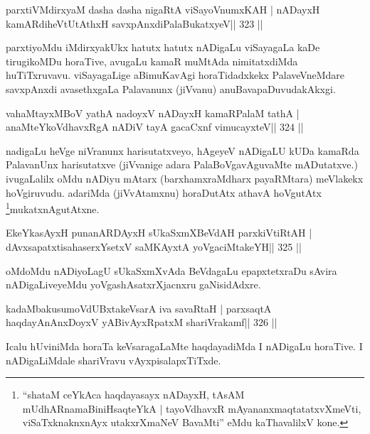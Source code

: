 
\begin{shl}
parxtiVMdirxyaM dasha dasha nigaRtA viSayoVnumxKAH |
nADayxH kamARdiheVtUtAthxH savxpAnxdiPalaBukatxyeV\hfill || 323 ||
\end{shl}

\begin{artha}
parxtiyoMdu iMdirxyakUkx hatutx hatutx nADigaLu viSayagaLa kaDe  tirugikoMDu horaTive, avugaLu kamaR muMtAda nimitatxdiMda huTiTxruvavu. viSayagaLige aBimuKavAgi horaTidadxkekx PalaveVneMdare  \mdash  savxpAnxdi avasethxgaLa Palavanunx (jiVvanu) anuBavapaDuvudakAkxgi.
\end{artha}

\begin{shl}
vahaMtayxMBoV yathA nadoyxV nADayxH kamaRPalaM tathA |
anaMteYkoVdhavxRgA nADiV tayA gacaCxnf vimucayxteV\hfill || 324 ||
\end{shl}

\begin{artha}
nadigaLu heVge niVranunx harisutatxveyo, hAgeyeV nADigaLU kUDa kamaRda 
PalavanUnx harisutatxve (jiVvanige adara PalaBoVgavAguvaMte 
mADutatxve.) ivugaLalilx oMdu nADiyu mAtarx (barxhamxraMdharx 
payaRMtara) meVlakekx hoVgiruvudu. adariMda (jiVvAtamxnu) horaDutAtx 
athavA hoVgutAtx \footnote{``shataM ceYkAca haqdayasayx nADayxH, 
tAsAM mUdhARnamaBiniHsaqteYkA | tayoVdhavxR mAyananxmaqtatatxvXmeVti, 
viSaTxknaknxnAyx utakxrXmaNeV BavaMti'' eMdu kaThavalilxV kone.}mukatxnAgutAtxne.
\end{artha}

\begin{shl}
EkeYkasAyxH punanARDAyxH sUkaSxmXBeVdAH parxkiVtiRtAH |
dAvxsapatxtisahaserxYsetxV saMKAyxtA yoVgaciMtakeYH\hfill || 325 ||
\end{shl}

\begin{artha}\footnotemark[5]oMdoMdu nADiyoLagU sUkaSxmXvAda BeVdagaLu epapxtetxraDu sAvira nADigaLiveyeMdu yoVgashAsatxrXjacnxru gaNisidAdxre.
\end{artha}


\begin{shl}
kadaMbakusumoVdUBxtakeVsarA iva savaRtaH |
parxsaqtA haqdayAnAnxDoyxV yABivAyxRpatxM shariVrakamf\hfill || 326 ||
\end{shl}

\begin{artha}
Icalu hUviniMda horaTa keVsaragaLaMte haqdayadiMda I nADigaLu horaTive. I nADigaLiMdale shariVravu vAyxpisalapxTiTxde.
\end{artha}

